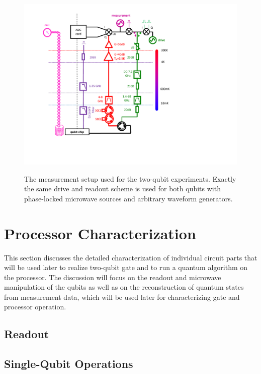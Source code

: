\begin{figure}
	\centering
		\includegraphics[width=1.\textwidth]{"./material/figures/2-qubit-processor/measurement setup"}
	\label{fig:MeasurementSetup}
	\caption[The measurement setup used for the two-qubit experiments]{The measurement setup used for the two-qubit experiments. Exactly the same drive and readout scheme is used for both qubits with phase-locked microwave sources and arbitrary waveform generators.}
\end{figure}

\section{Processor Characterization}

This section discusses the detailed characterization of individual circuit parts that will be used later to realize two-qubit gate and to run a quantum algorithm on the processor. The discussion will focus on the readout and microwave manipulation of the qubits as well as  on the reconstruction of quantum states from measurement data, which will be used later for characterizing gate and processor operation.

\subsection{Readout}


\subsection{Single-Qubit Operations}

